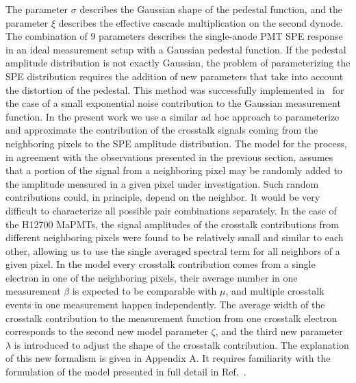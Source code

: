 The parameter ${\sigma}$ describes the Gaussian shape of the pedestal function, and the parameter ${\xi}$  describes the effective cascade multiplication on the second dynode. The combination of 9 parameters describes the single-anode PMT SPE response in an ideal measurement setup with a Gaussian pedestal function. If the pedestal amplitude distribution is not exactly Gaussian, the problem of parameterizing the SPE distribution requires the addition of new parameters that take into account the distortion of the pedestal. This method was successfully implemented in~\cite{DEGTIARENKO20171} for the case of a small exponential noise contribution to the Gaussian measurement function. In the present work we use a similar ad hoc approach to parameterize and approximate the contribution of the crosstalk signals coming from the neighboring pixels to the SPE amplitude distribution. The model for the process, in agreement with the observations presented in the previous section, assumes that a portion of the signal from a neighboring pixel may be randomly added to the amplitude measured in a given pixel under investigation. Such random contributions could, in principle, depend on the neighbor. It would be very difficult to characterize all possible pair combinations separately. In the case of the H12700 MaPMTs, the signal amplitudes of the crosstalk contributions from different neighboring pixels were found to be relatively small and similar to each other, allowing us to use the single averaged spectral term for all neighbors of a given pixel. In the model every crosstalk contribution comes from a single electron in one of the neighboring pixels, their average number in one measurement $\beta$ is expected to be comparable with $\mu$, and multiple crosstalk events in one measurement happen independently. The average width of the crosstalk contribution to the measurement function from one crosstalk electron corresponds to the second new model parameter $\zeta$, and the third new parameter $\lambda$ is introduced to adjust the shape of the crosstalk contribution. The explanation of this new formalism is given in Appendix A. It requires familiarity with the formulation of the model presented in full detail in Ref.~\cite{DEGTIARENKO20171}.

